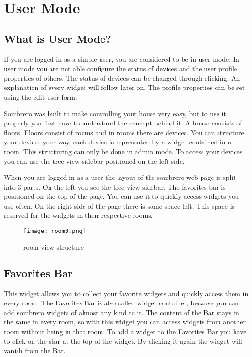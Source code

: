 \section{User Mode}
\subsection{What is User Mode?}

  If you are logged in as a simple user, you are considered to be in user mode. In user mode you are not able configure the status of devices and the user  profile properties of others. The status of devices can be changed through clicking. An explanation of every widget will follow later on. The profile properties can be set using the edit user form.

  Sombrero was built to make controlling your house very easy, but to use it properly you first have to understand the concept behind it. A house consists of floors. Floors consist of rooms and in rooms there are devices. You can structure your devices your way, each device is represented by a widget contained in a room. This structuring can only be done in admin mode. To access your devices you can use the tree view sidebar positioned on the left side.

  When you are logged in as a user the layout of the sombrero web page is split into 3 parts. On the left you see the tree view sidebar. The favorites bar is positioned on the top of the page. You can use it to quickly access widgets you use often. On the right side of the page there is some space left. This space is reserved for the widgets in their respective rooms.

  \begin{figure}[h]
  \centering
  \texttt{[image: room3.png]}
  \caption{room view structure}
  \label{fig:roomview}
  \end{figure}

  \clearpage
\subsection{Favorites Bar}
  This widget allows you to collect your favorite widgets and quickly access them in every room. The Favorites Bar is also called widget container, because you can add sombrero widgets of almost any kind to it. The content of the Bar stays in the same in every room, so with this widget you can access widgets from another room without being in that room. To add a widget to the Favorites Bar you have to click on the star at the top of the widget. By clicking it again the widget will vanish from the Bar.

